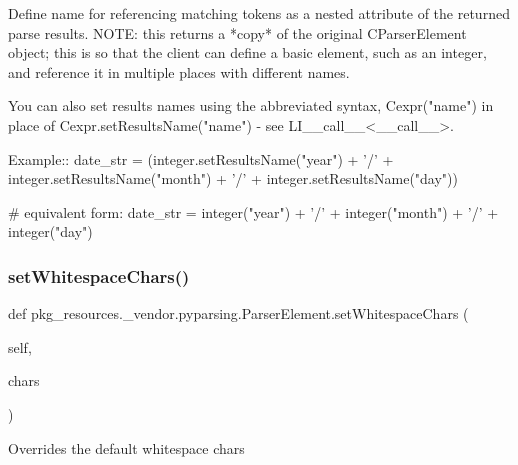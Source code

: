 \begin{DoxyVerb}Define name for referencing matching tokens as a nested attribute
of the returned parse results.
NOTE: this returns a *copy* of the original C{ParserElement} object;
this is so that the client can define a basic element, such as an
integer, and reference it in multiple places with different names.

You can also set results names using the abbreviated syntax,
C{expr("name")} in place of C{expr.setResultsName("name")} - 
see L{I{__call__}<__call__>}.

Example::
    date_str = (integer.setResultsName("year") + '/' 
        + integer.setResultsName("month") + '/' 
        + integer.setResultsName("day"))

    # equivalent form:
    date_str = integer("year") + '/' + integer("month") + '/' + integer("day")
\end{DoxyVerb}
 \mbox{\label{classpkg__resources_1_1__vendor_1_1pyparsing_1_1_parser_element_af541c731255fb5cc4e407841848e0bc5}} 
\subsubsection{\texorpdfstring{set\+Whitespace\+Chars()}{setWhitespaceChars()}}
{\footnotesize\ttfamily def pkg\+\_\+resources.\+\_\+vendor.\+pyparsing.\+Parser\+Element.\+set\+Whitespace\+Chars (\begin{DoxyParamCaption}\item[{}]{self,  }\item[{}]{chars }\end{DoxyParamCaption})}

\begin{DoxyVerb}Overrides the default whitespace chars
\end{DoxyVerb}
 \mbox{\label{classpkg__resources_1_1__vendor_1_1pyparsing_1_1_parser_element_a07496b6487e5aa0d90619fa4655e8393}} 

